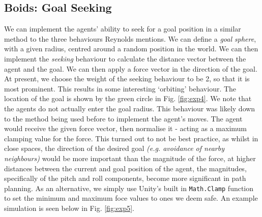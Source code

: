 \documentclass{article}
\begin{document}
\subsection{Boids: Goal Seeking}
We can implement the agents' ability to seek for a goal position in a similar method to the three behaviours Reynolds mentions. We can define a \emph{goal sphere}, with a given radius, centred around a random position in the world. We can then implement the \emph{seeking} behaviour to calculate the distance vector between the agent and the goal. We can then apply a force vector in the direction of the goal. At present, we choose the weight of the seeking behaviour to be 2, so that it is most prominent. This results in some interesting `orbiting' behaviour. The location of the goal is shown by the green circle in Fig. \ref{fig:exp4}. We note that the agents do not actually enter the goal radius. This behaviour was likely down to the method being used before to implement the agent's moves. The agent would receive the given force vector, then normalise it - acting as a maximum clamping value for the force. This turned out to not be best practice, as whilst in close spaces, the direction of the desired goal \emph{(e.g. avoidance of nearby neighbours)} would be more important than the magnitude of the force, at higher distances between the current and goal position of the agent, the magnitudes, specifically of the pitch and roll components, become more significant in path planning. As an alternative, we simply use Unity's built in \verb|Math.Clamp| function to set the minimum and maximum foce values to ones we deem safe. An example simulation is seen below in Fig. \ref{fig:exp5}.
\end{document}
